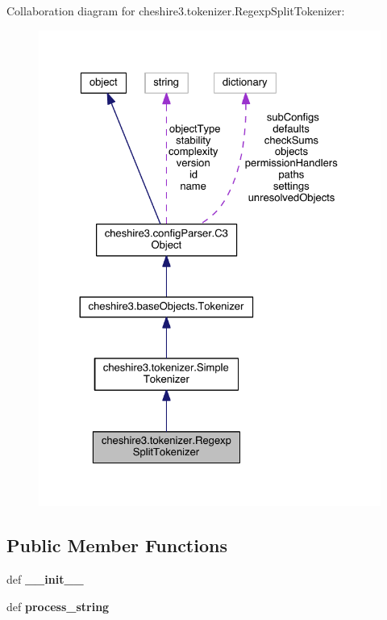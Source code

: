 Collaboration diagram for cheshire3.\-tokenizer.\-Regexp\-Split\-Tokenizer\-:
\nopagebreak
\begin{figure}[H]
\begin{center}
\leavevmode
\includegraphics[width=326pt]{classcheshire3_1_1tokenizer_1_1_regexp_split_tokenizer__coll__graph}
\end{center}
\end{figure}
\subsection*{Public Member Functions}
\begin{DoxyCompactItemize}
\item 
\hypertarget{classcheshire3_1_1tokenizer_1_1_regexp_split_tokenizer_a04c647b8f945c1c6a93ee79a9e3738b7}{def {\bfseries \-\_\-\-\_\-init\-\_\-\-\_\-}}\label{classcheshire3_1_1tokenizer_1_1_regexp_split_tokenizer_a04c647b8f945c1c6a93ee79a9e3738b7}

\item 
\hypertarget{classcheshire3_1_1tokenizer_1_1_regexp_split_tokenizer_abf2438213659f626b09dd75325c4521d}{def {\bfseries process\-\_\-string}}\label{classcheshire3_1_1tokenizer_1_1_regexp_split_tokenizer_abf2438213659f626b09dd75325c4521d}

\end{DoxyCompactItemize}
